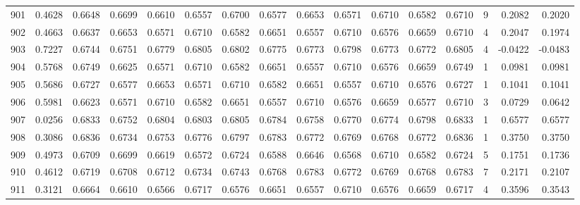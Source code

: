 \begin{tabular}{lrrrrrrrrrrrrrrr}
901 &      0.4628 &  0.6648 &  0.6699 &  0.6610 &  0.6557 &  0.6700 &  0.6577 &  0.6653 &  0.6571 &  0.6710 &   0.6582 &     0.6710 &      9 &                    0.2082 &                     0.2020 \\
902 &      0.4663 &  0.6637 &  0.6653 &  0.6571 &  0.6710 &  0.6582 &  0.6651 &  0.6557 &  0.6710 &  0.6576 &   0.6659 &     0.6710 &      4 &                    0.2047 &                     0.1974 \\
903 &      0.7227 &  0.6744 &  0.6751 &  0.6779 &  0.6805 &  0.6802 &  0.6775 &  0.6773 &  0.6798 &  0.6773 &   0.6772 &     0.6805 &      4 &                   -0.0422 &                    -0.0483 \\
904 &      0.5768 &  0.6749 &  0.6625 &  0.6571 &  0.6710 &  0.6582 &  0.6651 &  0.6557 &  0.6710 &  0.6576 &   0.6659 &     0.6749 &      1 &                    0.0981 &                     0.0981 \\
905 &      0.5686 &  0.6727 &  0.6577 &  0.6653 &  0.6571 &  0.6710 &  0.6582 &  0.6651 &  0.6557 &  0.6710 &   0.6576 &     0.6727 &      1 &                    0.1041 &                     0.1041 \\
906 &      0.5981 &  0.6623 &  0.6571 &  0.6710 &  0.6582 &  0.6651 &  0.6557 &  0.6710 &  0.6576 &  0.6659 &   0.6577 &     0.6710 &      3 &                    0.0729 &                     0.0642 \\
907 &      0.0256 &  0.6833 &  0.6752 &  0.6804 &  0.6803 &  0.6805 &  0.6784 &  0.6758 &  0.6770 &  0.6774 &   0.6798 &     0.6833 &      1 &                    0.6577 &                     0.6577 \\
908 &      0.3086 &  0.6836 &  0.6734 &  0.6753 &  0.6776 &  0.6797 &  0.6783 &  0.6772 &  0.6769 &  0.6768 &   0.6772 &     0.6836 &      1 &                    0.3750 &                     0.3750 \\
909 &      0.4973 &  0.6709 &  0.6699 &  0.6619 &  0.6572 &  0.6724 &  0.6588 &  0.6646 &  0.6568 &  0.6710 &   0.6582 &     0.6724 &      5 &                    0.1751 &                     0.1736 \\
910 &      0.4612 &  0.6719 &  0.6708 &  0.6712 &  0.6734 &  0.6743 &  0.6768 &  0.6783 &  0.6772 &  0.6769 &   0.6768 &     0.6783 &      7 &                    0.2171 &                     0.2107 \\
911 &      0.3121 &  0.6664 &  0.6610 &  0.6566 &  0.6717 &  0.6576 &  0.6651 &  0.6557 &  0.6710 &  0.6576 &   0.6659 &     0.6717 &      4 &                    0.3596 &                     0.3543 \\

\end{tabular}
